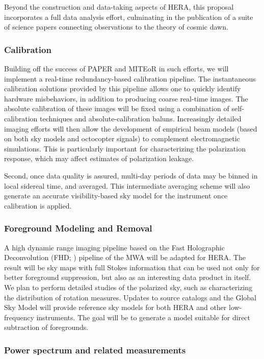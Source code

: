 \documentclass[preprint]{aastex}
\begin{document}
Beyond the construction and data-taking aspects of HERA, this proposal incorporates a full data analysis effort, culminating in the publication of a suite of science papers connecting observations to the theory of cosmic dawn.

\subsubsection{Calibration}

Building off the success of PAPER and MITEoR in such efforts, we will implement a real-time redundancy-based calibration pipeline.  The instantaneous calibration solutions provided by this pipeline allows one to quickly identify hardware misbehaviors, in addition to producing coarse real-time images.  The absolute calibration of these images will be fixed using a combination of self-calibration techniques and absolute-calibration baluns.  Increasingly detailed imaging efforts will then allow the development of empirical beam models (based on both sky models and octocopter signals) to complement electromagnetic simulations.  This is particularly important for characterizing the polarization response, which may affect estimates of polarization leakage.

Second, once data quality is assured, multi-day periods of data may be
binned in local sidereal time, and averaged. This intermediate
averaging scheme will also generate an accurate visibility-based sky
model for the instrument once calibration is applied.

\subsubsection{Foreground Modeling and Removal}

A high dynamic range imaging pipeline based on the Fast Holographic Deconvolution (FHD; \citealt{sullivan_et_al2012}) pipeline of the MWA will be adapted for HERA.  The result will be sky maps with full Stokes information that can be used not only for better foreground suppression, but also as an interesting data product in itself.  We plan to perform detailed studies of the polarized sky, such as characterizing the distribution of rotation measures.  Updates to source catalogs and the Global Sky Model \citep{deoliveira2008} will provide reference sky models for both HERA and other low-frequency instruments. The goal will be to generate a model suitable for direct subtraction of foregrounds. 


\subsubsection{Power spectrum and related measurements}
\end{document}
